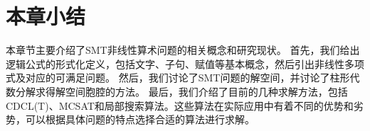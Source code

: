 \section{本章小结}

本章节主要介绍了SMT非线性算术问题的相关概念和研究现状。
首先，我们给出逻辑公式的形式化定义，包括文字、子句、赋值等基本概念，然后引出非线性多项式及对应的可满足问题。
然后，我们讨论了SMT问题的解空间，并讨论了柱形代数分解求得解空间胞腔的方法。
最后，我们介绍了目前的几种求解方法，包括CDCL(T)、MCSAT和局部搜索算法。这些算法在实际应用中有着不同的优势和劣势，可以根据具体问题的特点选择合适的算法进行求解。
